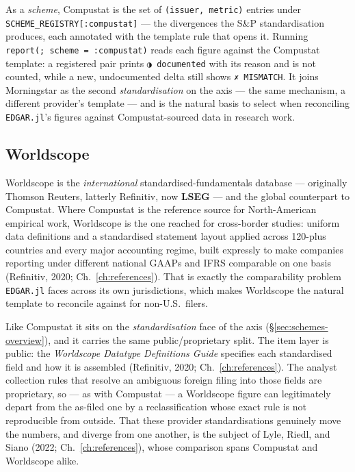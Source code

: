 \documentclass[11pt,a4paper]{report}
\newcommand{\statmark}[1]{{\symbolfont #1}}
\begin{document}
As a \emph{scheme}, Compustat is the set of \texttt{(issuer, metric)} entries under
\texttt{SCHEME\_REGISTRY[:compustat]} --- the divergences the S\&P standardisation produces, each annotated
with the template rule that opens it. Running \texttt{report(; scheme = :compustat)} reads each figure against
the Compustat template: a registered pair prints \texttt{\statmark{◑}~documented} with its reason and is not counted,
while a new, undocumented delta still shows \texttt{\statmark{✗}~MISMATCH}. It joins Morningstar as the second
\emph{standardisation} on the axis --- the same mechanism, a different provider's template --- and is the
natural basis to select when reconciling \texttt{EDGAR.jl}'s figures against Compustat-sourced data in
research work.

\subsection{Worldscope}
\label{sec:schemes-worldscope}

Worldscope is the \emph{international} standardised-fundamentals database --- originally Thomson Reuters,
latterly Refinitiv, now \textbf{LSEG} --- and the global counterpart to Compustat. Where Compustat is the
reference source for North-American empirical work, Worldscope is the one reached for cross-border studies:
uniform data definitions and a standardised statement layout applied across 120-plus countries and every major
accounting regime, built expressly to make companies reporting under different national GAAPs and IFRS
comparable on one basis (Refinitiv, 2020; Ch.~\ref{ch:references}). That is exactly the comparability problem
\texttt{EDGAR.jl} faces across its own jurisdictions, which makes Worldscope the natural template to reconcile
against for non-U.S.\ filers.

Like Compustat it sits on the \emph{standardisation} face of the axis (\S\ref{sec:schemes-overview}), and it
carries the same public/proprietary split. The item layer is public: the \emph{Worldscope Datatype
Definitions Guide} specifies each standardised field and how it is assembled (Refinitiv, 2020;
Ch.~\ref{ch:references}). The analyst collection rules that resolve an ambiguous foreign filing into those
fields are proprietary, so --- as with Compustat --- a Worldscope figure can legitimately depart from the
as-filed one by a reclassification whose exact rule is not reproducible from outside. That these provider
standardisations genuinely move the numbers, and diverge from one another, is the subject of Lyle, Riedl, and
Siano (2022; Ch.~\ref{ch:references}), whose comparison spans Compustat and Worldscope alike.
\end{document}
